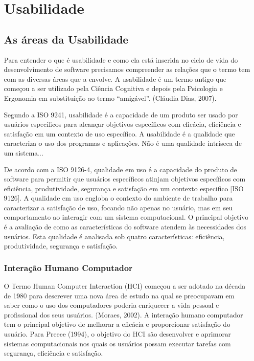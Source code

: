 \chapter{Usabilidade}

\section{As áreas da Usabilidade}

	Para entender o que é usabilidade e como ela está inserida no ciclo de vida do desenvolvimento de software precisamos compreender as relações que o termo tem com as diversas áreas que a envolve.
	A usabilidade é um termo antigo que começou a ser utilizado pela Ciência Cognitiva e depois pela Psicologia e Ergonomia em substituição ao termo “amigável”. (Cláudia Dias, 2007). 

	Segundo a ISO 9241, usabilidade é a capacidade de um produto ser usado por usuários específicos para alcançar objetivos específicos com eficácia, eficiência e satisfação em um contexto de uso específico.
	A usabilidade é a qualidade que caracteriza o uso dos programas e aplicações. Não é uma qualidade intríseca de um sistema...
	
	De acordo com a ISO 9126-4, qualidade em uso é a capacidade do produto de software para permitir que usuários específicos atinjam objetivos específicos com eficiência, produtividade, segurança e satisfação em um contexto especifico [ISO 9126]. A qualidade em uso engloba o contexto do ambiente de trabalho para caracterizar a satisfação de uso, focando não apenas no usuário, mas em seu comportamento ao interagir com um sistema computacional. O principal objetivo é a avaliação de como as características do software atendem às necessidades dos usuários. Esta qualidade é analisada sob quatro características: eficiência, produtividade, segurança e satisfação.


\subsection{Interação Humano Computador}

	O Termo Human Computer Interaction  (HCI) começou a ser adotado na década de 1980 para descrever uma nova área de estudo na qual se preocupavam em saber como o uso dos computadores poderia enriquecer a vida pessoal e profissional dos seus usuários. (Moraes, 2002). 
	A interação humano computador tem o principal objetivo de melhorar a eficácia e proporcionar satisfação do usuário. Para Preece (1994), o objetivo do HCI são desenvolver e aprimorar sistemas computacionais nos quais os usuários possam executar tarefas com segurança, eficiência e satisfação.

